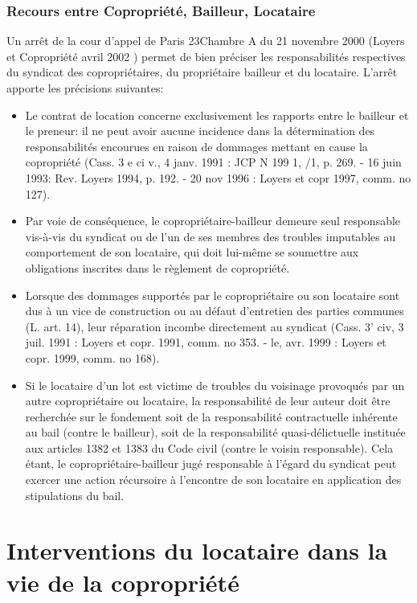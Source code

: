 		\subsubsection{Recours entre Copropriété, Bailleur, Locataire}

			Un arrêt de la cour d’appel de Paris 23\degres Chambre A du 21 novembre 2000 (Loyers et Copropriété avril 2002 ) permet de bien préciser les responsabilités respectives du syndicat des copropriétaires, du propriétaire bailleur et du locataire.
			L'arrêt apporte les précisions suivantes:
			\begin{itemize}
				\item Le contrat de location concerne exclusivement les rapports entre le bailleur et le preneur: il ne peut avoir aucune incidence dans la détermination des responsabilités encourues en raison de dommages mettant en cause la copropriété (Cass. 3 e ci v., 4 janv. 1991 : JCP N 199 1, /1, p. 269. - 16 juin 1993: Rev. Loyers 1994, p. 192. - 20 nov 1996 : Loyers et copr 1997, comm. no 127).
				\item Par voie de conséquence, le copropriétaire-bailleur demeure seul responsable vis-à-vis du syndicat ou de l'un de ses membres des troubles imputables au comportement de son locataire, qui doit lui-même se soumettre aux obligations inscrites dans le règlement de copropriété.
				\item Lorsque des dommages supportés par le copropriétaire ou son locataire sont dus à un vice de construction ou au défaut d'entretien des parties communes (L. art. 14), leur réparation incombe directement au syndicat (Cass. 3' civ, 3 juil. 1991 : Loyers et copr. 1991, comm. no 353. - le, avr. 1999 : Loyers et copr. 1999, comm. no 168).
				\item Si le locataire d'un lot est victime de troubles du voisinage provoqués par un autre copropriétaire ou locataire, la responsabilité de leur auteur doit être recherchée sur le fondement soit de la responsabilité contractuelle inhérente au bail (contre le bailleur), soit de la responsabilité quasi-délictuelle instituée aux articles 1382 et 1383 du Code civil (contre le voisin responsable).
				Cela étant, le copropriétaire-bailleur jugé responsable à l'égard du syndicat peut exercer une action récursoire à l'encontre de son locataire en application des stipulations du bail.
			\end{itemize}
	
\section{Interventions du locataire dans la vie de la copropriété}
	
